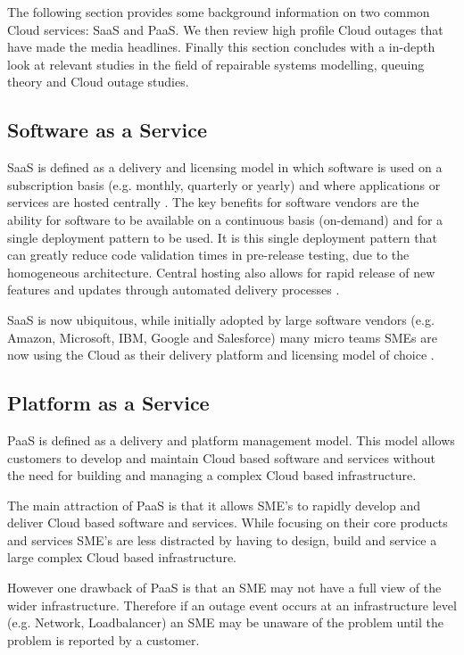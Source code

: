 \documentclass[5p]{elsarticle}
\begin{document}
The following section provides some background information on two common Cloud services: SaaS and PaaS. We then review high profile Cloud outages that have made the media headlines. Finally this section concludes with a in-depth look at relevant studies in the field of repairable systems modelling, queuing theory and Cloud outage studies.

\subsection{Software as a Service}
SaaS is defined as a delivery and licensing model in which software is used on a subscription basis (e.g. monthly, quarterly or yearly) and where applications or services are hosted centrally \cite{Cloudbook2015}. The key benefits for software vendors are the ability for software to be available on a continuous basis (on-demand) and for a single deployment pattern to be used. It is this single deployment pattern that can greatly reduce code validation times in pre-release testing, due to the homogeneous architecture. Central hosting also allows for rapid release of new features and updates through automated delivery processes \cite{datacentre2015}. 

SaaS is now ubiquitous, while initially adopted by large software vendors (e.g. Amazon, Microsoft, IBM, Google and Salesforce) many micro teams SMEs are now using the Cloud as their delivery platform and licensing model of choice \cite{CRN2015providers}. 

\subsection{Platform as a Service}
PaaS is defined as a delivery and platform management model. This model allows customers to develop and maintain Cloud based software and services without the need for building and managing a complex Cloud based infrastructure.

The main attraction of PaaS is that it allows SME's to rapidly develop and deliver Cloud based software and services. While focusing on their core products and services SME's are less distracted by having to design, build and service a large complex Cloud based infrastructure. 

However one drawback of PaaS is that an SME may not have a full view of the wider infrastructure. Therefore if an outage event occurs at an infrastructure level (e.g. Network, Loadbalancer) an SME may be unaware of the problem until the problem is reported by a customer.
\end{document}
